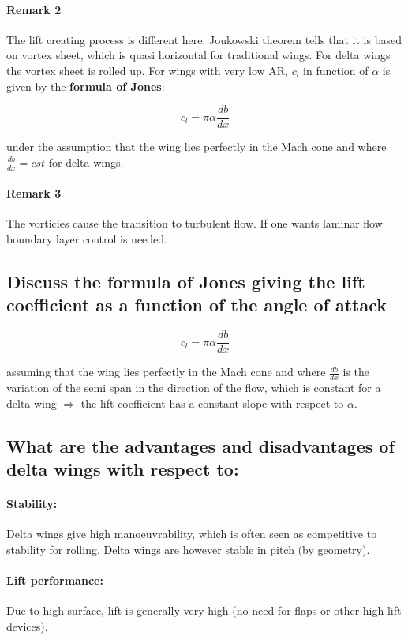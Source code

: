 \documentclass[british,french,11pt, a4paper, openany]{article}
\begin{document}
\paragraph{Remark 2}
The lift creating process is different here. Joukowski theorem tells that it is based on vortex sheet, which is quasi horizontal for traditional wings. For delta wings the vortex sheet is rolled up. For wings with very low AR, $c_l$ in function of $\alpha$ is given by the \textbf{formula of Jones}:

\begin{equation}
c_l = \pi \alpha \frac{db}{dx}
\end{equation}	 

under the assumption that the wing lies perfectly in the Mach cone and where $\frac{db}{dx}=cst$ for delta wings. 

\paragraph{Remark 3}
The vorticies cause the transition to turbulent flow. If one wants laminar flow boundary layer control is needed. 

\subsection{Discuss the formula of Jones giving the lift coefficient as a function of the angle of attack}
\begin{equation}
c_l = \pi \alpha \frac{db}{dx}
\end{equation}	 

assuming that the wing lies perfectly in the Mach cone and where $\frac{db}{dx}$ is the variation of the semi span in the direction of the flow, which is constant for a delta wing $\Rightarrow$ the lift coefficient has a constant slope with respect to $\alpha$.

\subsection{What are the advantages and disadvantages of delta wings with respect to:}
\paragraph{Stability:}
Delta wings give high manoeuvrability, which is often seen as competitive to stability for rolling. Delta wings are however stable in pitch (by geometry).

\paragraph{Lift performance:}
Due to high surface, lift is generally very high (no need for flaps or other high lift devices).
\end{document}
